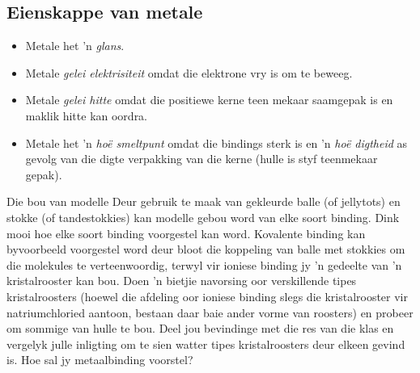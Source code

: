 \subsection*{Eienskappe van metale}
\begin{itemize}
 \item Metale het  'n \textsl{glans}.
\item Metale \textsl{gelei elektrisiteit} omdat die elektrone vry is om te beweeg.
\item Metale \textsl{gelei hitte} omdat die positiewe kerne teen mekaar saamgepak is en maklik hitte kan oordra.
\item Metale het 'n \textsl{ho\"{e} smeltpunt} omdat die bindings sterk is en 'n \textsl{ho\"{e} digtheid} as gevolg van die digte verpakking van die kerne (hulle is styf teenmekaar gepak).
\end{itemize}

        \label{m38694*id754}
            \begin{activity}{Die bou van modelle}
            \nopagebreak
Deur gebruik te maak van gekleurde balle (of jellytots) en stokke (of tandestokkies) kan modelle gebou word van elke soort binding. Dink mooi hoe elke soort binding voorgestel kan word.  Kovalente binding kan byvoorbeeld voorgestel word deur bloot die koppeling van balle met stokkies om die molekules te verteenwoordig, terwyl vir ioniese binding jy  'n gedeelte van  'n kristalrooster kan bou. Doen  'n  bietjie navorsing oor verskillende tipes kristalroosters (hoewel die afdeling oor ioniese binding slegs die kristalrooster vir natriumchloried aantoon, bestaan daar baie ander vorme van roosters) en probeer om sommige van hulle te bou. Deel jou bevindinge met die res van die klas en vergelyk julle inligting om te sien watter tipes kristalroosters deur elkeen gevind is. Hoe sal jy metaalbinding voorstel?
\end{activity}

